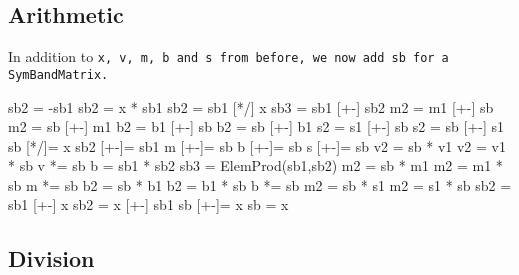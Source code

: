 \subsection{Arithmetic}
\label{SymBandMatrix_Arithmetic}

In addition to \tt{x}, \tt{v}, \tt{m}, \tt{b} and \tt{s} from before, 
we now add \tt{sb} for a \tt{SymBandMatrix}.

\begin{tmvcode}
sb2 = -sb1
sb2 = x * sb1
sb2 = sb1 [*/] x
sb3 = sb1 [+-] sb2
m2 = m1 [+-] sb
m2 = sb [+-] m1
b2 = b1 [+-] sb
b2 = sb [+-] b1
s2 = s1 [+-] sb
s2 = sb [+-] s1
sb [*/]= x
sb2 [+-]= sb1
m [+-]= sb
b [+-]= sb
s [+-]= sb
v2 = sb * v1
v2 = v1 * sb
v *= sb
b = sb1 * sb2
sb3 = ElemProd(sb1,sb2)
m2 = sb * m1
m2 = m1 * sb
m *= sb
b2 = sb * b1
b2 = b1 * sb
b *= sb
m2 = sb * s1
m2 = s1 * sb
sb2 = sb1 [+-] x
sb2 = x [+-] sb1
sb [+-]= x
sb = x
\end{tmvcode}

\subsection{Division}
\label{SymBandMatrix_Division}

